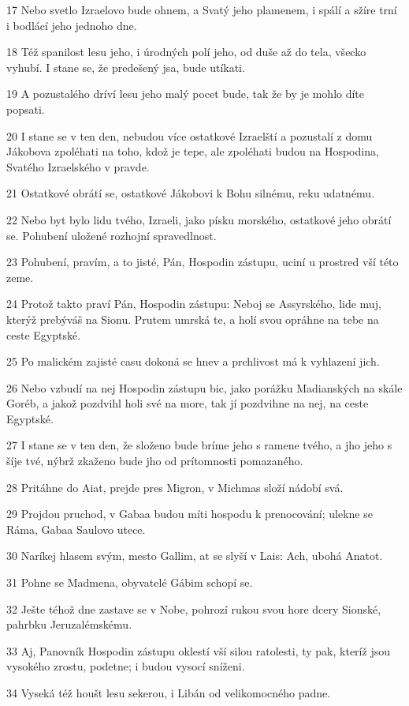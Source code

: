 \par 17 Nebo svetlo Izraelovo bude ohnem, a Svatý jeho plamenem, i spálí a sžíre trní i bodlácí jeho jednoho dne.
\par 18 Též spanilost lesu jeho, i úrodných polí jeho, od duše až do tela, všecko vyhubí. I stane se, že predešený jsa, bude utíkati.
\par 19 A pozustalého dríví lesu jeho malý pocet bude, tak že by je mohlo díte popsati.
\par 20 I stane se v ten den, nebudou více ostatkové Izraelští a pozustalí z domu Jákobova zpoléhati na toho, kdož je tepe, ale zpoléhati budou na Hospodina, Svatého Izraelského v pravde.
\par 21 Ostatkové obrátí se, ostatkové Jákobovi k Bohu silnému, reku udatnému.
\par 22 Nebo byt bylo lidu tvého, Izraeli, jako písku morského, ostatkové jeho obrátí se. Pohubení uložené rozhojní spravedlnost.
\par 23 Pohubení, pravím, a to jisté, Pán, Hospodin zástupu, uciní u prostred vší této zeme.
\par 24 Protož takto praví Pán, Hospodin zástupu: Neboj se Assyrského, lide muj, kterýž prebýváš na Sionu. Prutem umrská te, a holí svou opráhne na tebe na ceste Egyptské.
\par 25 Po malickém zajisté casu dokoná se hnev a prchlivost má k vyhlazení jich.
\par 26 Nebo vzbudí na nej Hospodin zástupu bic, jako porážku Madianských na skále Goréb, a jakož pozdvihl holi své na more, tak jí pozdvihne na nej, na ceste Egyptské.
\par 27 I stane se v ten den, že složeno bude bríme jeho s ramene tvého, a jho jeho s šíje tvé, nýbrž zkaženo bude jho od prítomnosti pomazaného.
\par 28 Pritáhne do Aiat, prejde pres Migron, v Michmas složí nádobí svá.
\par 29 Projdou pruchod, v Gabaa budou míti hospodu k prenocování; ulekne se Ráma, Gabaa Saulovo utece.
\par 30 Naríkej hlasem svým, mesto Gallim, at se slyší v Lais: Ach, ubohá Anatot.
\par 31 Pohne se Madmena, obyvatelé Gábim schopí se.
\par 32 Ješte téhož dne zastave se v Nobe, pohrozí rukou svou hore dcery Sionské, pahrbku Jeruzalémskému.
\par 33 Aj, Panovník Hospodin zástupu oklestí vší silou ratolesti, ty pak, kteríž jsou vysokého zrostu, podetne; i budou vysocí sníženi.
\par 34 Vyseká též houšt lesu sekerou, i Libán od velikomocného padne.

